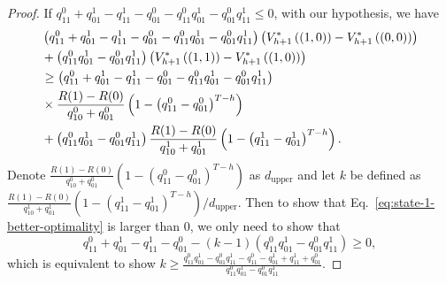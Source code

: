 \begin{proof}
If $q^0_{11}+q^1_{01}-q^1_{11}-q^0_{01}-q^0_{11}q^1_{01}-q^0_{01}q^1_{11}\leq 0$, with our hypothesis, we have
\begin{align}
    &\left(q^0_{11}+q^1_{01}-q^1_{11}-q^0_{01}-q^0_{11}q^1_{01}-q^0_{01}q^1_{11}\right)\left(V_{h+1}^*\left((1,0)\right)-V_{h+1}^*\left((0,0)\right)\right)\notag\\
    &+\left(q^0_{11}q^1_{01}-q^0_{01}q^1_{11}\right)\left(V_{h+1}^*\left((1,1)\right)-V_{h+1}^*\left((1,0)\right)\right)\notag\\
    &\geq \left(q^0_{11}+q^1_{01}-q^1_{11}-q^0_{01}-q^0_{11}q^1_{01}-q^0_{01}q^1_{11}\right)\notag\\&\times\frac{R(1)-R(0)}{q^0_{10}+q^0_{01}}\left(1-\left(q^0_{11}-q^0_{01}\right)^{T-h}\right)\notag\\
    &+\left(q^0_{11}q^1_{01}-q^0_{01}q^1_{11}\right)\frac{R(1)-R(0)}{q^1_{10}+q^1_{01}}\left(1-\left(q^1_{11}-q^1_{01}\right)^{T-h}\right).\label{eq:state-1-better-optimality}
\end{align}
Denote $\frac{R(1)-R(0)}{q^0_{10}+q^0_{01}}\left(1-\left(q^0_{11}-q^0_{01}\right)^{T-h}\right)$ as $d_{\text{upper}}$ and let $k$ be defined as\\ $\frac{R(1)-R(0)}{q^1_{10}+q^1_{01}}\left(1-\left(q^1_{11}-q^1_{01}\right)^{T-h}\right)/d_{\text{upper}}$. Then to show that Eq.~\eqref{eq:state-1-better-optimality} is larger than 0, we only need to show that
\begin{equation*}
    q^0_{11}+q^1_{01}-q^1_{11}-q^0_{01}-(k-1)\left(q^0_{11}q^1_{01}-q^0_{01}q^1_{11}\right)\geq 0,
\end{equation*}
which is equivalent to show $k\geq \frac{q^0_{11}q^1_{01}-q^0_{01}q^1_{11}-q^0_{11}-q^1_{01}+q^1_{11}+q^0_{01}}{q^0_{11}q^1_{01}-q^0_{01}q^1_{11}}$. 


\end{proof}

